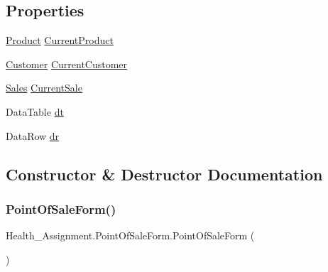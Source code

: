 \subsection*{Properties}
\begin{DoxyCompactItemize}
\item 
\hyperlink{class_health___assignment_1_1_product}{Product} \hyperlink{class_health___assignment_1_1_point_of_sale_form_ad82cfe050aa465444625df04b3449711}{Current\+Product}
\item 
\hyperlink{class_health___assignment_1_1_customer}{Customer} \hyperlink{class_health___assignment_1_1_point_of_sale_form_a9f81a5c274f4e874c4e25fa639141f20}{Current\+Customer}
\item 
\hyperlink{class_health___assignment_1_1_sales}{Sales} \hyperlink{class_health___assignment_1_1_point_of_sale_form_a075b448628a3083929f2dc1c153f1729}{Current\+Sale}
\item 
Data\+Table \hyperlink{class_health___assignment_1_1_point_of_sale_form_ad520ec34dbd3b0c5bf62c8fb8469e1ab}{dt}
\item 
Data\+Row \hyperlink{class_health___assignment_1_1_point_of_sale_form_aef74d578c3e5088a90b1e975ff0ef6a3}{dr}
\end{DoxyCompactItemize}


\subsection{Constructor \& Destructor Documentation}
\mbox{\label{class_health___assignment_1_1_point_of_sale_form_af4f5567d73c86b60e8c3257c591ac1cb}} 
\subsubsection{\texorpdfstring{Point\+Of\+Sale\+Form()}{PointOfSaleForm()}}
{\footnotesize\ttfamily Health\+\_\+\+Assignment.\+Point\+Of\+Sale\+Form.\+Point\+Of\+Sale\+Form (\begin{DoxyParamCaption}{ }\end{DoxyParamCaption})\hspace{0.3cm}{\ttfamily [inline]}}



